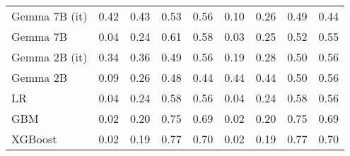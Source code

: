 \begin{tabular}{lllllllll}
Gemma 7B (it) & \cellcolor{orange!12.0} 0.42 & 0.43 & 0.53 & 0.56 & 0.10 & \cellcolor{cyan!4.9} 0.26 & \cellcolor{orange!4.9} 0.49 & \cellcolor{orange!25.0} 0.44 \\
Gemma 7B & \cellcolor{cyan!25.0} 0.04 & \cellcolor{cyan!19.0} 0.24 & 0.61 & 0.58 & \cellcolor{cyan!25.0} 0.03 & \cellcolor{cyan!13.7} 0.25 & 0.52 & 0.55 \\
Gemma 2B (it) & 0.34 & 0.36 & \cellcolor{orange!9.3} 0.49 & 0.56 & 0.19 & 0.28 & 0.50 & 0.56 \\
Gemma 2B & 0.09 & \cellcolor{cyan!4.7} 0.26 & \cellcolor{orange!25.0} 0.48 & \cellcolor{orange!25.0} 0.44 & \cellcolor{orange!25.0} 0.44 & \cellcolor{orange!25.0} 0.44 & 0.50 & 0.56 \\
LR & 0.04 & 0.24 & 0.58 & 0.56 & 0.04 & 0.24 & 0.58 & 0.56 \\
GBM & 0.02 & 0.20 & 0.75 & 0.69 & 0.02 & 0.20 & 0.75 & 0.69 \\
XGBoost & 0.02 & 0.19 & 0.77 & 0.70 & 0.02 & 0.19 & 0.77 & 0.70 \\
\bottomrule
\end{tabular}

